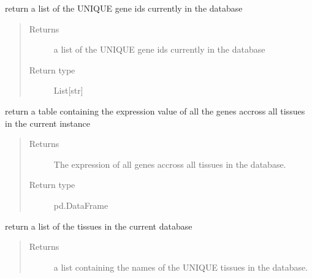\documentclass[letterpaper,10pt,english]{sphinxmanual}
\begin{document}
\begin{fulllineitems}
\begin{fulllineitems}
\label{\detokenize{IPTK.Classes:IPTK.Classes.Database.GeneExpressionDB.get_genes}}
return a list of the UNIQUE gene ids currently in the database
\begin{quote}\begin{description}
\item[{Returns}] \leavevmode
a list of the UNIQUE gene ids currently in the database

\item[{Return type}] \leavevmode
List{[}str{]}

\end{description}\end{quote}

\end{fulllineitems}


\begin{fulllineitems}
\label{\detokenize{IPTK.Classes:IPTK.Classes.Database.GeneExpressionDB.get_table}}
return a table containing the expression value of all the genes accross all tissues in the current instance
\begin{quote}\begin{description}
\item[{Returns}] \leavevmode
The expression of all genes accross all tissues in the database.

\item[{Return type}] \leavevmode
pd.DataFrame

\end{description}\end{quote}

\end{fulllineitems}


\begin{fulllineitems}
\label{\detokenize{IPTK.Classes:IPTK.Classes.Database.GeneExpressionDB.get_tissues}}
return a list of the tissues in the current database
\begin{quote}\begin{description}
\item[{Returns}] \leavevmode
a list containing the names of the UNIQUE tissues in the database.


\end{description}
\end{quote}
\end{fulllineitems}
\end{fulllineitems}
\end{document}
